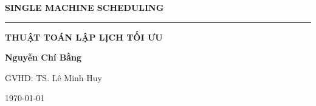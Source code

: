 \documentclass[12pt,a4paper]{report}
\begin{document}
 
    \begin{titlepage}
	\centering
    \phantom{}\par
	\vspace{3cm}
	{\LARGE\textbf{SINGLE MACHINE SCHEDULING }\par}
	\vspace{1cm}
	\rule{5cm}{0.5pt}\par
	\vspace{1cm}
		{\LARGE\textbf{THUẬT TOÁN LẬP LỊCH TỐI ƯU}\par}
	\vspace{1cm}
	\Large\textbf{Nguyễn Chí Bằng}\par		
	\vspace{1cm}
	\Large{GVHD: TS. Lê Minh Huy}\par		
	\vspace{1cm}
    \today
    \end{titlepage}

\thispagestyle{empty} %
\mbox{}

	\tableofcontents

	\thispagestyle{empty} %
	\mbox{}
\end{document}
